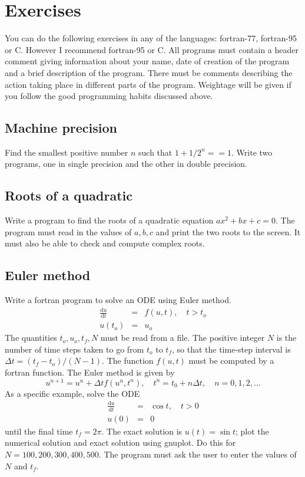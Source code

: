\documentclass[11pt,oneside]{amsart}
\newcommand{\ud}{\textrm{d}}
\newcommand{\dd}[2]{\frac{\ud #1}{\ud #2}}
\begin{document}
\section{Exercises}

You can do the following exercises in any of the languages: fortran-77, fortran-95 or C. However I recommend fortran-95 or C. All programs must contain a header comment giving information about your name, date of creation of the program and a brief description of the program. There must be comments describing the action taking place in different parts of the program. Weightage will be given if you follow the good programming habits discussed above.

\subsection{Machine precision}
Find the smallest positive number $n$ such that $1 + 1/2^n == 1$. Write two programs, one in single precision and the other in double precision.

\subsection{Roots of a quadratic}
Write a program to find the roots of a quadratic equation $ax^2 + bx + c=0$. The program must read in the values of $a,b,c$ and print the two roots to the screen. It must also be able to check and compute complex roots.

\subsection{Euler method}
\label{euler}
Write a fortran program to solve an ODE using Euler method.
\begin{eqnarray*}
\dd{u}{t} &=& f(u,t), \quad t > t_o \\
u(t_o) &=& u_o
\end{eqnarray*}
The quantities $t_o, u_o, t_f, N$ must be read from a file. The positive integer $N$ is the number of time steps taken to go from $t_o$ to $t_f$, so that the time-step interval is $\Delta t = (t_f-t_o)/(N-1)$. The function $f(u,t)$ must be computed by a fortran function. The Euler method is given by
\begin{equation}
u^{n+1} = u^n + \Delta t f(u^n, t^n), \quad t^n = t_0 + n \Delta t, \quad n=0,1,2,\ldots
\end{equation}
As a specific example, solve the ODE
\begin{eqnarray*}
\dd{u}{t} &=& \cos t, \quad t > 0 \\
u(0) &=& 0
\end{eqnarray*}
until the final time $t_f = 2\pi$. The exact solution is $u(t) = \sin t$; plot the numerical solution and exact solution using gnuplot. Do this for $N=100, 200, 300, 400, 500$. The program must ask the user to enter the values of $N$ and $t_f$.
\end{document}
